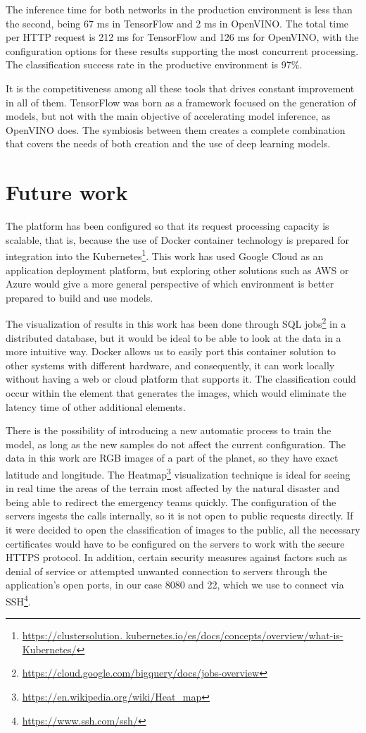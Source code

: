 The inference time for both networks in the production environment is less than the second, being 67 ms in TensorFlow and 2 ms in OpenVINO\@. The total time per HTTP request is 212 ms for TensorFlow and 126 ms for OpenVINO, with the configuration options for these results supporting the most concurrent processing.
The classification success rate in the productive environment is 97\%.

It is the competitiveness among all these tools that drives constant improvement in all of them.
TensorFlow was born as a framework focused on the generation of  models, but not with the main objective of accelerating model inference, as OpenVINO does. The symbiosis between them creates a complete combination that covers the needs of both creation and the use of deep learning models.


\section{Future work}\label{sec: future-work}
The platform has been configured so that its request processing capacity is scalable, that is, because the use of Docker container technology is prepared for integration into the Kubernetes\footnote{\url{https://clustersolution. kubernetes.io/es/docs/concepts/overview/what-is-Kubernetes/}}.
This work has used Google Cloud as an application deployment platform, but exploring other solutions such as AWS or Azure would give a more general perspective of which environment is better prepared to build and use  models.

The visualization of results in this work has been done through SQL jobs\footnote{\url{https://cloud.google.com/bigquery/docs/jobs-overview}} in a distributed database, but it would be ideal to be able to look at the data in a more intuitive way.
Docker allows us to easily port this container solution to other systems with different hardware, and consequently, it can work locally without having a web or cloud platform that supports it.
The classification could occur within the element that generates the images, which would eliminate the latency time of other additional elements.

There is the possibility of introducing a new automatic process to train the model, as long as the new samples do not affect the current configuration.
The data in this work are RGB images of a part of the planet, so they have exact latitude and longitude.
The Heatmap\footnote{\url{https://en.wikipedia.org/wiki/Heat\_map}} visualization technique is ideal for seeing in real time the areas of the terrain most affected by the natural disaster and being able to redirect the emergency teams quickly.
The configuration of the servers ingests the calls internally, so it is not open to public requests directly.
If it were decided to open the classification of images to the public, all the necessary certificates would have to be configured on the servers to work with the secure HTTPS protocol. In addition, certain security measures against factors such as denial of service or attempted unwanted connection to servers through the application's open ports, in our case 8080 and 22, which we use to connect via SSH\footnote{\url{https://www.ssh.com/ssh/}}.

